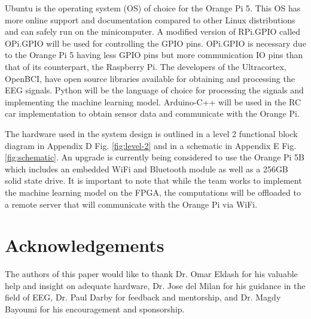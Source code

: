 \documentclass[conference]{IEEEtran}
\begin{document}
    Ubuntu is the operating system (OS) of choice for the Orange Pi 5. This OS has more online support and documentation compared to other Linux distributions and can safely run on the minicomputer. A modified version of RPi.GPIO called OPi.GPIO will be used for controlling the GPIO pins. OPi.GPIO is necessary due to the Orange Pi 5 having less GPIO pins but more communication IO pins than that of its counterpart, the Raspberry Pi. The developers of the Ultracortex, OpenBCI, have open source libraries available for obtaining and processing the EEG signals. Python will be the language of choice for processing the signals and implementing the machine learning model. Arduino-C++ will be used in the RC car implementation to obtain sensor data and communicate with the Orange Pi. 

    The hardware used in the system design is outlined in a level 2 functional block diagram in Appendix D Fig. \ref{fig:level-2} and in a schematic in Appendix E Fig. \ref{fig:schematic}. An upgrade is currently being considered to use the Orange Pi 5B which includes an embedded WiFi and Bluetooth module as well as a 256GB solid state drive. It is important to note that while the team works to implement the machine learning model on the FPGA, the computations will be offloaded to a remote server that will communicate with the Orange Pi via WiFi. 

    
    

\section*{Acknowledgements}
The authors of this paper would like to thank Dr. Omar Eldash for his valuable help and insight on adequate hardware, Dr. Jose del Milan for his guidance in the field of EEG, Dr. Paul Darby for feedback and mentorship, and Dr. Magdy Bayoumi for his encouragement and sponsorship.  



\end{document}
